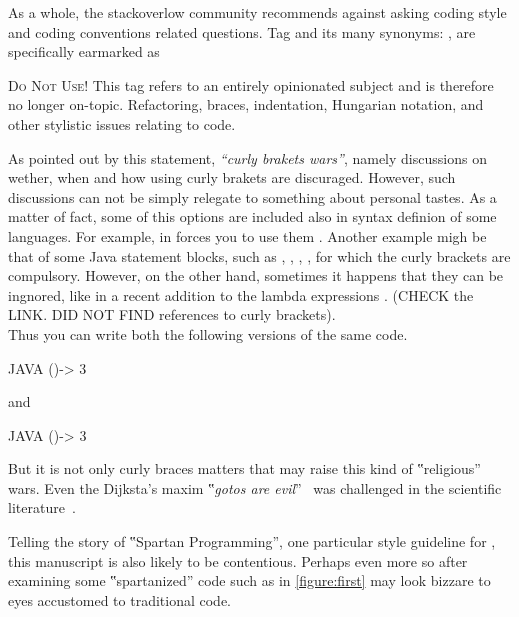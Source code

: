 As a whole, the stackoverlow community
recommends against asking coding style and coding conventions related questions.
Tag  and its many synonyms: ,
 are specifically
earmarked as

\begin{tcolorbox}[colback=green!5!white,colframe=blue!25!white,notitle]
    \textsc{Do Not Use!} 
This tag refers to an entirely opinionated subject and is therefore
no longer on-topic. Refactoring, braces, indentation, Hungarian notation, and
other stylistic issues relating to code.
\end{tcolorbox}

As pointed out by this statement, \emph{``curly brakets wars''}, namely discussions 
on wether, when and how using curly brakets are discuraged. 
However, such discussions can not be simply relegate to something about personal 
tastes. 
As a matter of fact, some of this options are included also in syntax definion of some languages. 
For example, in \Go forces you to use them .
Another example migh be that of some Java statement blocks, such as , , ,
, for which the curly brackets are compulsory.
However, on the other hand, sometimes it happens that they can be ingnored, like in a recent addition to 
the lambda expressions .
(CHECK the LINK. DID NOT FIND references to curly brackets).\\ 
Thus you can write both the following versions of the same code.
\begin{code}{JAVA}
()-> 3
\end{code}
and
\begin{code}{JAVA}
  ()-> {3}
\end{code}
% 

But it is not only curly braces matters that may raise
this kind of ‟religious” wars. Even the Dijksta's maxim ‟\emph{gotos
are evil}”~\cite{Dijkstra:1968} was challenged in the scientific
literature~\cite{Knuth:1974,Ramshaw:1988,Bochmann:1973,Sennesh:Gil:2016,Zoethout:1979,Wulf:1979,Clark:1984}.

Telling the story of ‟Spartan Programming”, one particular style guideline for
\Java, this manuscript is also likely to be contentious. Perhaps even more so
after examining some ‟spartanized” code such as in \cref{figure:first} 
may look bizzare to eyes accustomed to traditional \Java code.

